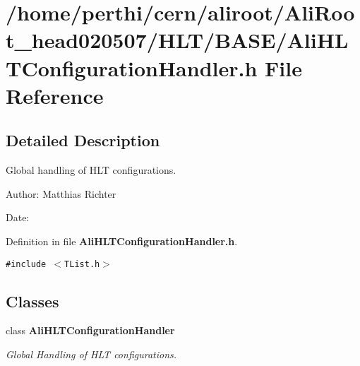 \section{/home/perthi/cern/aliroot/Ali\-Root\_\-head020507/HLT/BASE/Ali\-HLTConfiguration\-Handler.h File Reference}
\label{AliHLTConfigurationHandler_8h}


\subsection{Detailed Description}
Global handling of HLT configurations. 

\begin{Desc}
\item[Author:]Matthias Richter \end{Desc}
\begin{Desc}
\item[Date:]\end{Desc}


Definition in file {\bf Ali\-HLTConfiguration\-Handler.h}.

{\tt \#include $<$TList.h$>$}\par
\subsection*{Classes}
\begin{CompactItemize}
\item 
class {\bf Ali\-HLTConfiguration\-Handler}
\begin{CompactList}\small\item\em Global Handling of HLT configurations. \item\end{CompactList}\end{CompactItemize}
